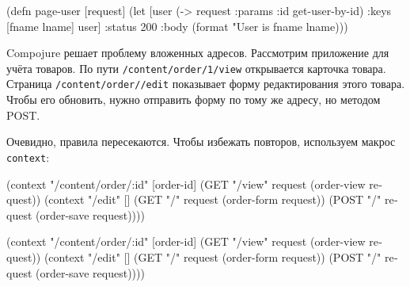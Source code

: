 \ifnarrow

\begin{english}
  \begin{clojure}
(defn page-user [request]
   (let [user (-> request
                  :params
                  :id
                  get-user-by-id)
         {:keys [fname lname]} user]
     {:status 200
      :body (format "User is %
                    fname lname)}))
  \end{clojure}
\end{english}

\else

\begin{english}
\end{english}

\fi

Compojure решает проблему вложенных адресов. Рассмотрим приложение для учёта
товаров. По пути \verb|/content/order/1/view| открывается карточка
товара. Страница \texttt{/content/order//edit} показывает форму
редактирования этого товара. Чтобы его обновить, нужно отправить форму по тому
же адресу, но методом POST.

Очевидно, правила пересекаются. Чтобы избежать повторов, используем макрос
\texttt{con\-text}:


\ifnarrow

\begin{english}
  \begin{clojure}
(context "/content/order/:id" [order-id]
  (GET  "/view" request
        (order-view request))
  (context "/edit" []
    (GET  "/" request
          (order-form request))
    (POST "/" request
          (order-save request))))
  \end{clojure}
\end{english}

\else

\begin{english}
  \begin{clojure}
(context "/content/order/:id" [order-id]
  (GET  "/view" request (order-view request))
  (context "/edit" []
    (GET  "/" request (order-form request))
    (POST "/" request (order-save request))))
  \end{clojure}
\end{english}

